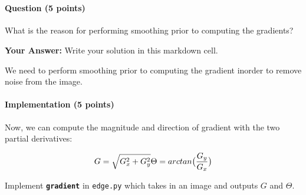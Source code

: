\documentclass[11pt]{article}
\begin{document}
    \begin{center}
    \end{center}
    { \hspace*{\fill} \\}
    
    \hypertarget{question-5-points}{%
\paragraph{Question (5 points)}\label{question-5-points}}

What is the reason for performing smoothing prior to computing the
gradients?

    \textbf{Your Answer:} Write your solution in this markdown cell.

We need to perform smoothing prior to computing the gradient inorder to
remove noise from the image.

    \hypertarget{implementation-5-points}{%
\paragraph{Implementation (5 points)}\label{implementation-5-points}}

Now, we can compute the magnitude and direction of gradient with the two
partial derivatives:

\[
G = \sqrt{G_{x}^{2}+G_{y}^{2}} \\
\Theta = arctan\bigl(\frac{G_{y}}{G_{x}}\bigr)
\]

Implement \textbf{\texttt{gradient}} in \texttt{edge.py} which takes in
an image and outputs \(G\) and \(\Theta\).
\end{document}
